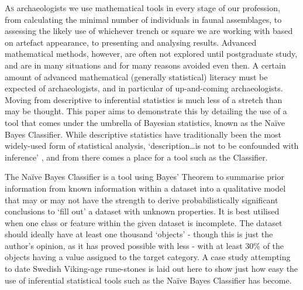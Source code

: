 \lettrine[nindent=0em,lines=3]{A}{s} archaeologists we use mathematical tools in every stage of our profession, from calculating the minimal number of individuals in faunal assemblages, to assessing the likely use of whichever trench or square we are working with based on artefact appearance, to presenting and analysing results. Advanced mathematical methods, however, are often not explored until postgraduate study, and are in many situations and for many reasons avoided even then. A certain amount of advanced mathematical (generally statistical) literacy must be expected of archaeologists, and in particular of up-and-coming archaeologists. Moving from descriptive to inferential statistics is much less of a stretch than may be thought. This paper aims to demonstrate this by detailing the use of a tool that comes under the umbrella of Bayesian statistics, known as the Naïve Bayes Classifier. While descriptive statistics have traditionally been the most widely-used form of statistical analysis, ‘description…is not to be confounded with inference’ \parencite[5]{Buck_1996}, and from there comes a place for a tool such as the Classifier. 

	The Naïve Bayes Classifier is a tool using Bayes’ Theorem to summarise prior information from known information within a dataset into a qualitative model that may or may not have the strength to derive probabilistically significant conclusions to ‘fill out’ a dataset with unknown properties. It is best utilised when one class or feature within the given dataset is incomplete. The dataset should ideally have at least one thousand ‘objects’ - though this is just the author’s opinion, as it has proved possible with less - with at least 30\% of the objects having a value assigned to the target category. A case study attempting to date Swedish Viking-age rune-stones is laid out here to show just how easy the use of inferential statistical tools such as the Naïve Bayes Classifier has become. 

	
